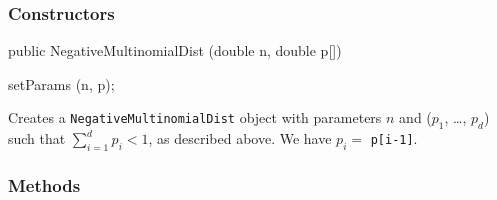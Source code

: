 \subsubsection* {Constructors}

\begin{code}

   public NegativeMultinomialDist (double n, double p[]) \begin{hide} {
      setParams (n, p);
   }\end{hide}
\end{code}
\begin{tabb}
   Creates a \texttt{NegativeMultinomialDist} object with parameters $n$
    and ($p_1$, \ldots, $p_d$) such that $\sum_{i=1}^{d} p_i < 1$,
   as described above. We have $p_i = $ \texttt{p[i-1]}.
\end{tabb}

\subsubsection* {Methods}

